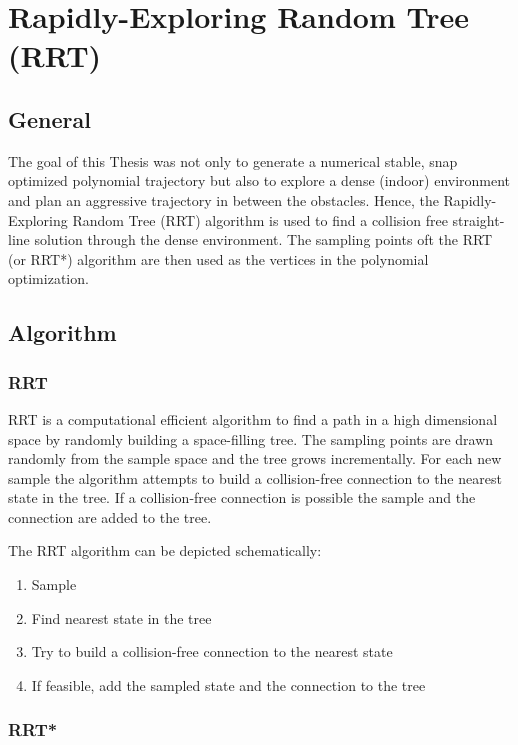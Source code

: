 \chapter{Rapidly-Exploring Random Tree (RRT)}\label{chap:RRT}

\section{General}

The goal of this Thesis was not only to generate a numerical stable, snap optimized polynomial trajectory but also to explore a dense (indoor) environment and plan an aggressive trajectory in between the obstacles. Hence, the Rapidly-Exploring Random Tree (RRT) algorithm is used to find a collision free straight-line solution through the dense environment. The sampling points oft the RRT (or RRT*) algorithm are then used as the vertices in the polynomial optimization.

\section{Algorithm}

\subsection{RRT}

RRT is a computational efficient algorithm to find a path in a high dimensional space by randomly building a space-filling tree. The sampling points are drawn randomly from the sample space and the tree grows incrementally. 
For each new sample the algorithm attempts to build a collision-free connection to the nearest state in the tree. If a collision-free connection is possible the sample and the connection are added to the tree. \newline

The RRT algorithm can be depicted schematically:


\begin{enumerate}
  \item Sample
  \item Find nearest state in the tree
  \item Try to build a collision-free connection to the nearest state
  \item If feasible, add the sampled state and the connection to the tree
\end{enumerate}

\subsection{RRT*}

